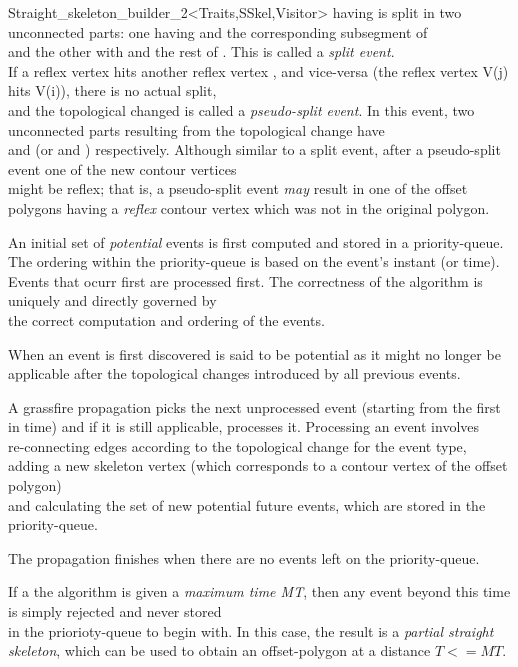 \begin{ccRefClass}{Straight_skeleton_builder_2<Traits,SSkel,Visitor>}
having  is split in two unconnected parts: one having  and the corresponding subsegment of \\ 
and the other with  and the rest of . This is called a {\em split event}.\\
If a reflex vertex  hits another reflex vertex , and vice-versa (the reflex vertex V(j) hits V(i)), there is no actual split,\\
and the topological changed is called a {\em pseudo-split event}. In this event, two unconnected parts resulting from the topological change have \\ 
and  (or  and ) respectively. Although similar to a split event, after a pseudo-split event one of the new contour vertices\\
might be reflex; that is, a pseudo-split event \textit{may} result in one of the offset polygons having a \textit{reflex} contour vertex which was not in the original polygon.

An initial set of \textit{potential} events is first computed and stored in a priority-queue. The ordering within the priority-queue is based on the event's instant (or time).
Events that ocurr first are processed first. The correctness of the algorithm is uniquely and directly governed by\\
the correct computation and ordering of the events.

When an event is first discovered is said to be potential as it might no longer be applicable after the topological changes introduced by all previous events.

A grassfire propagation picks the next unprocessed event (starting from the first in time) and if it is still applicable, processes it. Processing an event involves\\
re-connecting edges according to the topological change for the event type, adding a new skeleton vertex (which corresponds to a contour vertex of the offset polygon)\\
and calculating the set of new potential future events, which are stored in the priority-queue.

The propagation finishes when there are no events left on the priority-queue.

If a the algorithm is given a {\em maximum time MT}, then any event beyond this time is simply rejected and never stored\\
in the priorioty-queue to begin with. In this case, the result is a {\em partial straight skeleton}, which can be used to obtain an offset-polygon at a distance $T<=MT$.


\end{ccRefClass}
